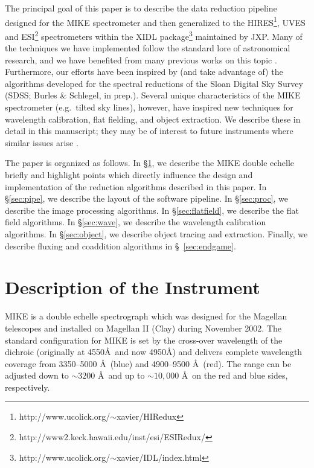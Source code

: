 \documentclass[]{emulateapj}
\begin{document}
The principal goal of this paper is to describe the data reduction pipeline
designed for the MIKE spectrometer and then generalized
to the HIRES\footnote{http://www.ucolick.org/$\sim$xavier/HIRedux}, 
UVES \citep[e.g.][]{epl07}
and ESI\footnote{http://www2.keck.hawaii.edu/inst/esi/ESIRedux/}
spectrometers within the XIDL
package\footnote{http://www.ucolick.org/$\sim$xavier/IDL/index.html}
maintained by JXP. Many of the techniques
we have implemented follow the standard lore of astronomical
research, and we have benefited from many previous
works on this topic \citep[e.g.][]{church,kelson03}.
Furthermore, our efforts have been inspired by (and take advantage of)
the algorithms developed for the spectral reductions of the 
Sloan Digital Sky Survey (SDSS; Burles \& Schlegel, in prep.).
Several unique characteristics of the MIKE spectrometer (e.g.\ tilted
sky lines),
however, have inspired new techniques for wavelength calibration,
flat fielding, and object extraction.
We describe these in detail in this manuscript; 
they may be of interest to future instruments
where similar issues arise \citep[e.g.\ X-shooter;][]{xshooter}.

The paper is organized as follows.  In \S \ref{sec:design}, we
describe the MIKE double echelle briefly and highlight points which
directly influence the design and implementation of the reduction 
algorithms described in this paper.
In  \S \ref{sec:pipe}, we describe the layout of the software pipeline.
In  \S \ref{sec:proc},  we describe the image processing algorithms.
In  \S \ref{sec:flatfield}, we describe the flat field algorithms.
In  \S \ref{sec:wave}, we describe the wavelength calibration
algorithms.
In  \S \ref{sec:object}, we describe object tracing and extraction.
Finally, we describe fluxing and coaddition algorithms in
\S~\ref{sec:endgame}.


\section{Description of the Instrument} 
\label{sec:design}

MIKE is a double echelle spectrograph which was designed for the
Magellan telescopes and installed on Magellan II (Clay) 
during November 2002.
The standard configuration for MIKE is set by the cross-over
wavelength of the dichroic 
(originally at 4550\AA\ and now 4950\AA) 
and delivers complete wavelength
coverage from 3350--5000 \AA\ (blue) and 4900--9500 \AA\ (red).  The
range can be adjusted down to $\sim3200$ \AA\ and up to $\sim10,000$
\AA\ on the red and blue sides, respectively.
\end{document}
